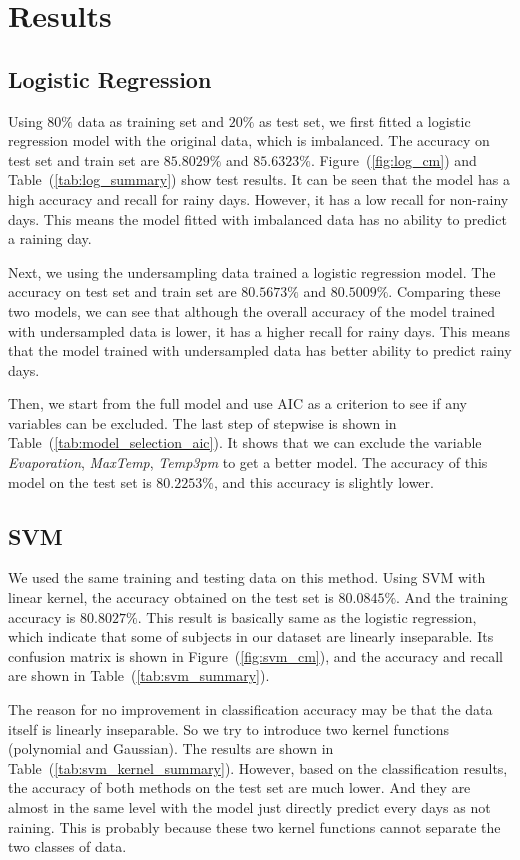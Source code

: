 \documentclass[11pt, a4paper, jou]{apa7}
\begin{document}
\section{Results}

\subsection{Logistic Regression}
    Using $80\%$ data as training set and $20\%$ as test set, we first fitted a logistic regression model with the original data, which is imbalanced. The accuracy on test set and train set are $85.8029\%$ and $85.6323\%$. Figure~(\ref{fig:log_cm}) and Table~(\ref{tab:log_summary}) show test results. It can be seen that the model has a high accuracy and recall for rainy days. However, it has a low recall for non-rainy days. This means the model fitted with imbalanced data has no ability to predict a raining day. 
    
    Next, we using the undersampling data trained a logistic regression model. The accuracy on test set and train set are $80.5673\%$ and $80.5009\%$. Comparing these two models, we can see that although the overall accuracy of the model trained with undersampled data is lower, it has a higher recall for rainy days. This means that the model trained with undersampled data has better ability to predict rainy days. 

    Then, we start from the full model and use AIC as a criterion to see if any variables can be excluded. The last step of stepwise is shown in Table~(\ref{tab:model_selection_aic}). It shows that we can exclude the variable \emph{Evaporation}, \emph{MaxTemp}, \emph{Temp3pm} to get a better model. The accuracy of this model on the test set is $80.2253\%$, and this accuracy is slightly lower. 

\subsection{SVM}
    We used the same training and testing data on this method. Using SVM with linear kernel, the accuracy obtained on the test set is $80.0845\%$. And the training accuracy is $80.8027\%$. This result is basically same as the logistic regression, which indicate that some of subjects in our dataset are linearly inseparable. Its confusion matrix is shown in Figure~(\ref{fig:svm_cm}), and the accuracy and recall are shown in Table~(\ref{tab:svm_summary}). 

    The reason for no improvement in classification accuracy may be that the data itself is linearly inseparable. So we try to introduce two kernel functions (polynomial and Gaussian). The results are shown in Table~(\ref{tab:svm_kernel_summary}). However, based on the classification results, the accuracy of both methods on the test set are much lower. And they are almost in the same level with the model just directly predict every days as not raining. This is probably because these two kernel functions cannot separate the two classes of data. 
\end{document}
